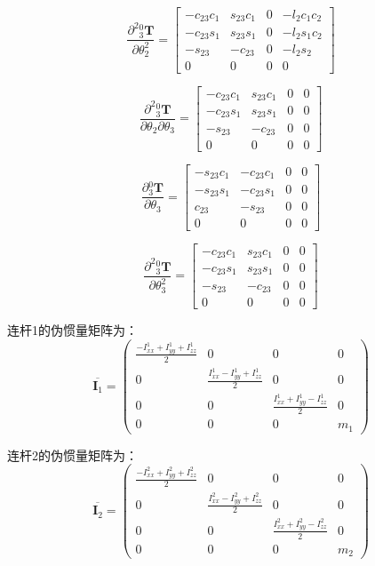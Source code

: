 \documentclass{homework}
\begin{document}
\begin{sol}
\[
  \frac{\partial^2 {_3^0}\mathbf{T}}{\partial \theta_2^2} =
  \begin{bmatrix} 
    -c_{23} c_{1} & s_{23} c_{1} & 0 & - l_{2} c_{1} c_{2} \\ 
    -c_{23} s_{1} & s_{23} s_{1} & 0 & - l_{2} s_{1} c_{2} \\ 
    -s_{23} & -c_{23} & 0 & -l_{2} s_{2} \\ 
    0 & 0 & 0 & 0
  \end{bmatrix}
\]

\[
  \frac{\partial^2 {_3^0}\mathbf{T}}{\partial \theta_2 \partial \theta_3} =
  \begin{bmatrix} 
    -c_{23} c_{1} & s_{23} c_{1} & 0 & 0 \\ 
    -c_{23} s_{1} & s_{23} s_{1} & 0 & 0 \\ 
    -s_{23} & -c_{23} & 0 & 0 \\ 
    0 & 0 & 0 & 0
  \end{bmatrix}
\]

\[
  \frac{\partial {_3^0}\mathbf{T}}{\partial \theta_3} =
  \begin{bmatrix} 
    -s_{23} c_{1} & -c_{23} c_{1} & 0 & 0 \\ 
    -s_{23} s_{1} & -c_{23} s_{1} & 0 & 0 \\ 
    c_{23} & -s_{23} & 0 & 0 \\ 
    0 & 0 & 0 & 0
  \end{bmatrix}
\]

\[
  \frac{\partial^2 {_3^0}\mathbf{T}}{\partial \theta_3^2} =
  \begin{bmatrix} 
    -c_{23} c_{1} & s_{23} c_{1} & 0 & 0 \\ 
    -c_{23} s_{1} & s_{23} s_{1} & 0 & 0 \\ 
    -s_{23} & -c_{23} & 0 & 0 \\ 
    0 & 0 & 0 & 0
  \end{bmatrix}
\]

连杆1的伪惯量矩阵为：
\[
  \overline{\mathbf{I}_1} = 
  \begin{pmatrix}
    \frac{-I_{xx}^1 + I_{yy}^1 + I_{zz}^1}{2} & 0 & 0 & 0 \\
    0 & \frac{I_{xx}^1 - I_{yy}^1 + I_{zz}^1}{2} & 0 & 0 \\
    0 & 0 & \frac{I_{xx}^1 + I_{yy}^1 - I_{zz}^1}{2} & 0 \\
    0 & 0 & 0 & m_1
  \end{pmatrix}
\]

连杆2的伪惯量矩阵为：
\[
  \overline{\mathbf{I}_2} = 
  \begin{pmatrix}
    \frac{-I_{xx}^2 + I_{yy}^2 + I_{zz}^2}{2} & 0 & 0 & 0 \\
    0 & \frac{I_{xx}^2 - I_{yy}^2 + I_{zz}^2}{2} & 0 & 0 \\
    0 & 0 & \frac{I_{xx}^2 + I_{yy}^2 - I_{zz}^2}{2} & 0 \\
    0 & 0 & 0 & m_2
  \end{pmatrix}
\]


\end{sol}
\end{document}

